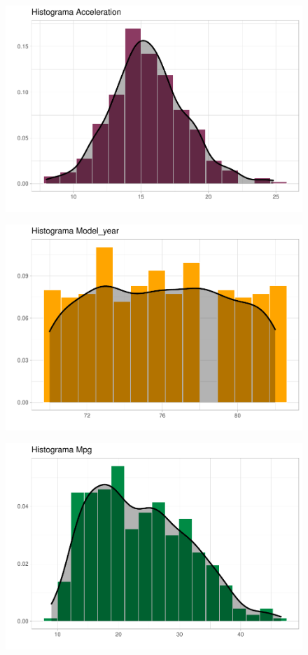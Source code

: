 \begin{figure}[H]\includegraphics[width=.9\linewidth]{img/EDA_files/figure-latex/unnamed-chunk-7-4} \caption{}\end{figure}
\begin{figure}[H]\includegraphics[width=.9\linewidth]{img/EDA_files/figure-latex/unnamed-chunk-7-5} \caption{}\end{figure}
\begin{figure}[H]\includegraphics[width=.9\linewidth]{img/EDA_files/figure-latex/unnamed-chunk-7-6} \caption{}\end{figure}


